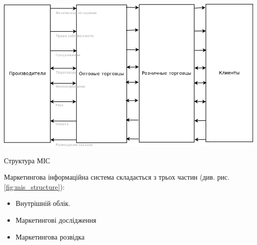 
\begin{stdfigure}
\includegraphics[width=6in]{images/mis_structure.png}
\caption{Структура МІС}
\label{fig:mis_structure}
\end{stdfigure}
 
Маркетингова інформаційна система складається з трьох частин (див. рис. \ref{fig:mis_structure}): 
\begin{itemize}
\item Внутрішній облік.
\item Маркетингові дослідження
\item Маркетингова розвідка
\end{itemize}


